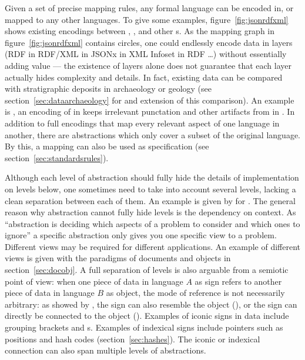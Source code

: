 Given a set of precise mapping rules, any formal language can be encoded in, or
mapped to any other languages. To give some examples,
figure~\ref{fig:jsonrdfxml} shows existing encodings between ,
,  and other s. As the
mapping graph in figure~\ref{fig:jsonrdfxml} contains circles, one could
endlessly encode data in layers (RDF in RDF/XML in JSONx in XML Infoset in RDF
\ldots) without essentially adding value --- the existence of layers alone does
not guarantee that each layer actually hides complexity and details. In fact,
existing data can be compared with stratigraphic deposits in archaeology or
geology (see section~\ref{sec:dataarchaeology} for and extension of this
comparison). An example is , an encoding of  in
 keeps irrelevant punctation and other artifacts from  in
. In addition to full encodings that map every relevant aspect of
one language in another, there are abstractions which only cover a subset of
the original language. By this, a mapping can also be used as specification
(see section~\ref{sec:standardsrules}).


Although each level of abstraction should fully hide the details of
implementation on levels below, one sometimes need to take into account several
levels, lacking a clean separation between each of them. An example is given by
\textcite{Thomale2010} for . The general reason why abstraction
cannot fully hide levels is the dependency on context. As ``abstraction is
deciding which aspects of a problem to consider and which ones to ignore''
\cite{Koenig1998} a specific abstraction only gives you one specific view to a
problem. Different views may be required for different applications. An
example of different views is given with the paradigms of documents and objects
in section~\ref{sec:docobj}.  A full separation of levels is also arguable from a
semiotic point of view: when one piece of data in language $A$ as sign refers
to another piece of data in language $B$ as object, the mode of reference is
not necessarily arbitrary: as showed by , the
sign can also resemble the object (), or the sign can
directly be connected to the object ().  Examples of iconic
signs in data include grouping brackets and s. 
Examples of indexical signs include pointers such as positions and hash codes
(section~\ref{sec:hashes}).  The iconic or indexical connection can also span
multiple levels of abstractions.

